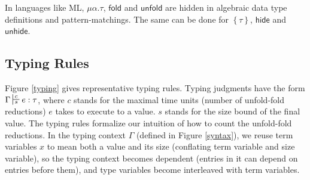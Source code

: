 \documentclass[preprint]{sigplanconf}
\newcommand{\thide}[1]{\left \{ #1 \right \}}
\newcommand{\typing}[4]{\sststile{#4}{#3}#1:#2}
\newcommand{\symfold}{\mathsf{fold}}
\newcommand{\symunfold}{\mathsf{unfold}}
\newcommand{\symhide}{\mathsf{hide}}
\newcommand{\symunhide}{\mathsf{unhide}}
\begin{document}
In languages like ML, $\mu\alpha.\tau$, $\symfold$ and $\symunfold$ are hidden in algebraic data type definitions and pattern-matchings. The same can be done for $\thide{\tau}$, $\symhide$ and $\symunhide$.

\subsection{Typing Rules}

Figure \ref{typing} gives representative typing rules. Typing judgments have the form $\Gamma\typing{e}{\tau}{c}{s}$, where $c$ stands for the maximal time units (number of unfold-fold reductions) $e$ takes to execute to a value. $s$ stands for the size bound of the final value. The typing rules formalize our intuition of how to count the unfold-fold reductions. In the typing context $\Gamma$ (defined in Figure \ref{syntax}), we reuse term variables $x$ to mean both a value and its size (conflating term variable and size variable), so the typing context becomes dependent (entries in it can depend on entries before them), and type variables become interleaved with term variables. 
\end{document}
